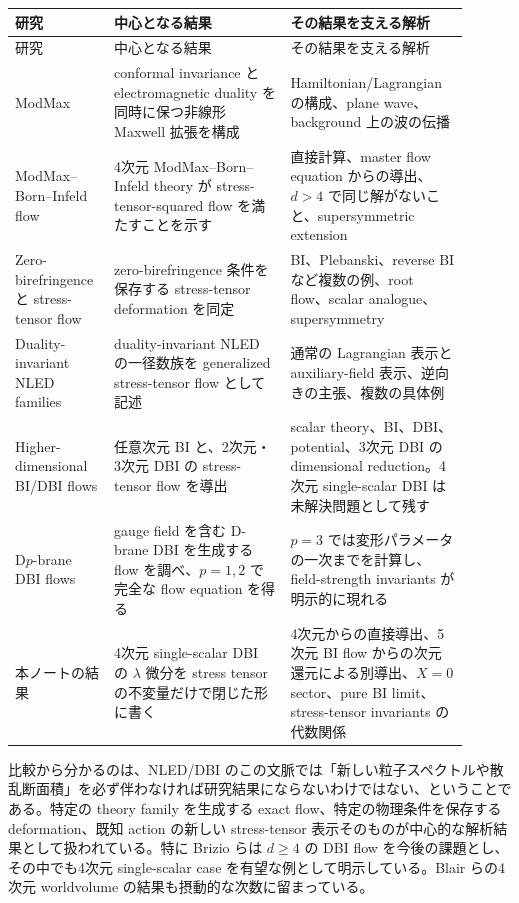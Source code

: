 \documentclass[a4paper,11pt]{ltjsreport}
\begin{document}
\begin{footnotesize}
\begin{longtable}{>{\raggedright\arraybackslash}p{0.19\linewidth}>{\raggedright\arraybackslash}p{0.36\linewidth}>{\raggedright\arraybackslash}p{0.35\linewidth}}
\toprule
研究 & 中心となる結果 & その結果を支える解析\\
\midrule
\endfirsthead
\toprule
研究 & 中心となる結果 & その結果を支える解析\\
\midrule
\endhead
ModMax\cite{Bandos2020}
& conformal invariance と electromagnetic duality を同時に保つ非線形 Maxwell 拡張を構成
& Hamiltonian/Lagrangian の構成、plane wave、background 上の波の伝播\\
\addlinespace
ModMax--Born--Infeld flow\cite{Ferko2022ModMax}
& 4次元 ModMax--Born--Infeld theory が stress-tensor-squared flow を満たすことを示す
& 直接計算、master flow equation からの導出、$d>4$ で同じ解がないこと、supersymmetric extension\\
\addlinespace
Zero-birefringence と stress-tensor flow\cite{Ferko2023b}
& zero-birefringence 条件を保存する stress-tensor deformation を同定
& BI、Plebanski、reverse BI など複数の例、root flow、scalar analogue、supersymmetry\\
\addlinespace
Duality-invariant NLED families\cite{Ferko2023a}
& duality-invariant NLED の一径数族を generalized stress-tensor flow として記述
& 通常の Lagrangian 表示と auxiliary-field 表示、逆向きの主張、複数の具体例\\
\addlinespace
Higher-dimensional BI/DBI flows\cite{Brizio2026}
& 任意次元 BI と、2次元・3次元 DBI の stress-tensor flow を導出
& scalar theory、BI、DBI、potential、3次元 DBI の dimensional reduction。4次元 single-scalar DBI は未解決問題として残す\\
\addlinespace
D$p$-brane DBI flows\cite{Blair2025}
& gauge field を含む D-brane DBI を生成する flow を調べ、$p=1,2$ で完全な flow equation を得る
& $p=3$ では変形パラメータの一次までを計算し、field-strength invariants が明示的に現れる\\
\addlinespace
本ノートの結果
& 4次元 single-scalar DBI の $\lambda$ 微分を stress tensor の不変量だけで閉じた形に書く
& 4次元からの直接導出、5次元 BI flow からの次元還元による別導出、$X=0$ sector、pure BI limit、stress-tensor invariants の代数関係\\
\bottomrule
\end{longtable}
\end{footnotesize}

比較から分かるのは、NLED/DBI のこの文脈では「新しい粒子スペクトルや散乱断面積」を必ず伴わなければ研究結果にならないわけではない、ということである。特定の theory family を生成する exact flow、特定の物理条件を保存する deformation、既知 action の新しい stress-tensor 表示そのものが中心的な解析結果として扱われている。特に Brizio らは $d\geq4$ の DBI flow を今後の課題とし、その中でも4次元 single-scalar case を有望な例として明示している。Blair らの4次元 worldvolume の結果も摂動的な次数に留まっている。
\end{document}
